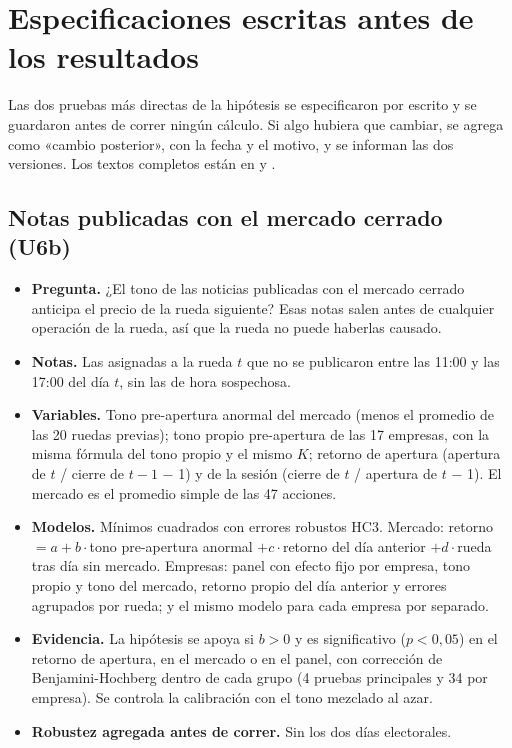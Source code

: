 \chapter{Especificaciones escritas antes de los resultados}
\label{anx:especificaciones}

Las dos pruebas más directas de la hipótesis se especificaron por escrito y se guardaron antes
de correr ningún cálculo. Si algo hubiera que cambiar, se agrega como «cambio posterior», con la
fecha y el motivo, y se informan las dos versiones. Los textos completos están en
 y
.

\section{Notas publicadas con el mercado cerrado (U6b)}

\begin{itemize}
  \item \textbf{Pregunta.} ¿El tono de las noticias publicadas con el mercado cerrado anticipa
        el precio de la rueda siguiente? Esas notas salen antes de cualquier operación de la
        rueda, así que la rueda no puede haberlas causado.
  \item \textbf{Notas.} Las asignadas a la rueda $t$ que no se publicaron entre las 11:00 y las
        17:00 del día $t$, sin las de hora sospechosa.
  \item \textbf{Variables.} Tono pre-apertura anormal del mercado (menos el promedio de las 20
        ruedas previas); tono propio pre-apertura de las 17 empresas, con la misma fórmula del
        tono propio y el mismo $K$; retorno de apertura (apertura de $t$ / cierre de $t-1$
        $-$ 1) y de la sesión (cierre de $t$ / apertura de $t$ $-$ 1). El mercado es el
        promedio simple de las 47 acciones.
  \item \textbf{Modelos.} Mínimos cuadrados con errores robustos HC3. Mercado: retorno $= a +
        b\cdot$tono pre-apertura anormal $+ c\cdot$retorno del día anterior $+ d\cdot$rueda tras
        día sin mercado. Empresas: panel con efecto fijo por empresa, tono propio y tono del
        mercado, retorno propio del día anterior y errores agrupados por rueda; y el mismo
        modelo para cada empresa por separado.
  \item \textbf{Evidencia.} La hipótesis se apoya si $b>0$ y es significativo ($p<0{,}05$) en
        el retorno de apertura, en el mercado o en el panel, con corrección de
        Benjamini-Hochberg dentro de cada grupo (4 pruebas principales y 34 por empresa). Se
        controla la calibración con el tono mezclado al azar.
  \item \textbf{Robustez agregada antes de correr.} Sin los dos días electorales.
\end{itemize}

